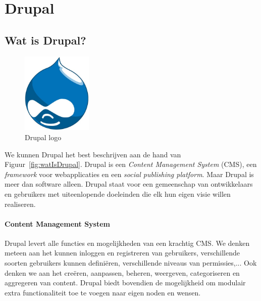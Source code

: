\chapter{Drupal} \label{Drupal}
\section{Wat is Drupal?}
\begin{figure}
\vspace{-40pt}
\centering
\label{fig:drupalLogo}
\includegraphics[width=0.3\textwidth]{fig/drupalLogo}
\vspace{-30pt}
\centering
\caption{Drupal logo}
\centering
\vspace{-40pt}
\end{figure}
We kunnen Drupal het best beschrijven aan de hand van Figuur~\ref{fig:watIsDrupal}.
Drupal is een \textit{Content Management System} (CMS), een \textit{framework} voor webapplicaties en een \textit{social publishing platform}. Maar Drupal is meer dan software alleen. Drupal staat voor een gemeenschap van ontwikkelaars en gebruikers met uiteenlopende doeleinden die elk hun eigen visie willen realiseren.~\cite{drupalDefGuide}

\subsubsection{Content Management System}
Drupal levert alle functies en mogelijkheden van een krachtig CMS. We denken meteen aan het kunnen inloggen en registreren van gebruikers, verschillende soorten gebruikers kunnen defini\"{e}ren, verschillende niveaus van permissies,... Ook denken we aan het cre\"{e}ren, aanpassen, beheren, weergeven, categoriseren en aggregeren van content. Drupal biedt bovendien de mogelijkheid om modulair extra functionaliteit toe te voegen naar eigen noden en wensen.

